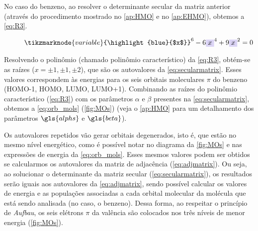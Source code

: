 No caso do benzeno, ao resolver o determinante secular da matriz anterior (através do procedimento mostrado no \autoref{ap:HMO} e no \autoref{ap:EHMO}), obtemos a \autoref{eq:R3}.

\begin{figure}[htb]
\begin{equation}
    \label{eq:R3}
    \tikzmarknode{variable}{\highlight{blue}{$x$}}^6 - 6\highlight{blue}{$x$}^4 + 9\highlight{blue}{$x$}^2 = 0
\end{equation}
\vspace{2\baselineskip}
\end{figure}

Resolvendo o polinômio (chamado polinômio característico) da \autoref{eq:R3}, obtém-se as raízes ($x = \pm 1, \pm 1, \pm 2$), que são os autovalores da \autoref{eq:secularmatrix}. Esses valores correspondem às energias para os seis orbitais moleculares $\pi$ do benzeno (\gls{HOMO}-1, \gls{HOMO}, \gls{LUMO}, \gls{LUMO}+1). Combinando as raízes do polinômio característico (\autoref{eq:R3}) com os parâmetros $\alpha$ e $\beta$ presentes na \autoref{eq:secularmatrix}, obtemos a \autoref{eq:orb_mols} (\autoref{fig:MOs}) (veja o \autoref{ap:HMO} para um detalhamento dos parâmetros $\gls{alphs}$ e $\gls{beta}$).

Os autovalores repetidos vão gerar orbitais degenerados, isto é, que estão no mesmo nível energético, como é possível notar no diagrama da \autoref{fig:MOs} e nas expressões de energia da \autoref{eq:orb_mols}. Esses mesmos valores podem ser obtidos se calcularmos os autovalores da matriz de adjacência (\autoref{eq:adjmatrix}). Ou seja, ao solucionar o determinante da matriz secular (\autoref{eq:secularmatrix}), os resultados serão iguais aos autovalores da \autoref{eq:adjmatrix}, sendo possível calcular os valores de energia e as populações associadas a cada orbital molecular da molécula que está sendo analisada (no caso, o benzeno). Dessa forma, ao respeitar o princípio de \textit{Aufbau}, os seis elétrons $\pi$ da valência são colocados nos três níveis de menor energia (\autoref{fig:MOs}).

